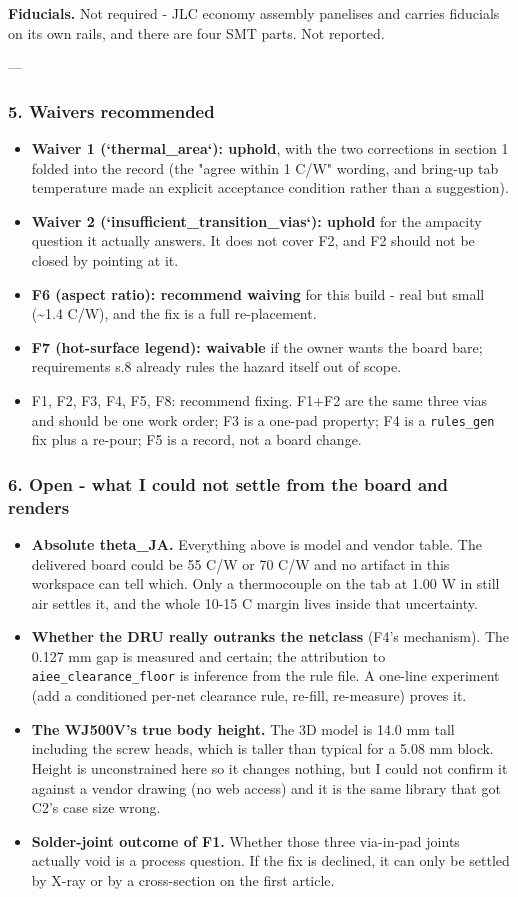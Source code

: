 \documentclass[11pt,a4paper]{article}
\begin{document}
\textbf{Fiducials.} Not required - JLC economy assembly panelises and carries fiducials on its own rails, and there are four SMT parts. Not reported.

---

\subsubsection*{5. Waivers recommended}
\begin{itemize}
\item \textbf{Waiver 1 (`thermal\_area`): uphold}, with the two corrections in section 1
folded into the record (the "agree within 1 C/W" wording, and bring-up tab
temperature made an explicit acceptance condition rather than a suggestion).
\item \textbf{Waiver 2 (`insufficient\_transition\_vias`): uphold} for the ampacity
question it actually answers. It does not cover F2, and F2 should not be
closed by pointing at it.
\item \textbf{F6 (aspect ratio): recommend waiving} for this build - real but small
(\textasciitilde{}1.4 C/W), and the fix is a full re-placement.
\item \textbf{F7 (hot-surface legend): waivable} if the owner wants the board bare;
requirements s.8 already rules the hazard itself out of scope.
\item F1, F2, F3, F4, F5, F8: recommend fixing. F1+F2 are the same three vias and
should be one work order; F3 is a one-pad property; F4 is a \texttt{rules\_gen} fix
plus a re-pour; F5 is a record, not a board change.
\end{itemize}
\subsubsection*{6. Open - what I could not settle from the board and renders}
\begin{itemize}
\item \textbf{Absolute theta\_JA.} Everything above is model and vendor table. The
delivered board could be 55 C/W or 70 C/W and no artifact in this workspace
can tell which. Only a thermocouple on the tab at 1.00 W in still air
settles it, and the whole 10-15 C margin lives inside that uncertainty.
\item \textbf{Whether the DRU really outranks the netclass} (F4's mechanism). The
0.127 mm gap is measured and certain; the attribution to
\texttt{aiee\_clearance\_floor} is inference from the rule file. A one-line
experiment (add a conditioned per-net clearance rule, re-fill, re-measure)
proves it.
\item \textbf{The WJ500V's true body height.} The 3D model is 14.0 mm tall including
the screw heads, which is taller than typical for a 5.08 mm block. Height is
unconstrained here so it changes nothing, but I could not confirm it against
a vendor drawing (no web access) and it is the same library that got C2's
case size wrong.
\item \textbf{Solder-joint outcome of F1.} Whether those three via-in-pad joints
actually void is a process question. If the fix is declined, it can only be
settled by X-ray or by a cross-section on the first article.
\end{itemize}
\end{document}
